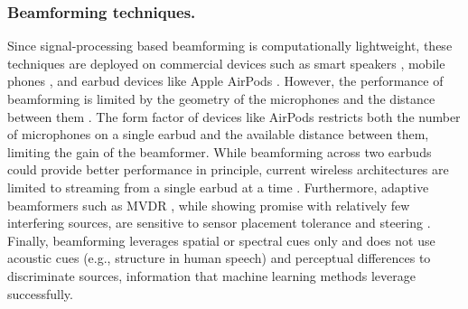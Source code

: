 \documentclass [11pt, proquest] {uwthesis}[2020/02/24]
\begin{document}
\subsubsection{Beamforming techniques.}  Since signal-processing based beamforming is computationally lightweight, these techniques are deployed on  commercial devices such as smart speakers \cite{amazon}, mobile phones \cite{samsungglobalnewsroom_2014}, and earbud devices like Apple AirPods \cite{airpods}. However, the performance of beamforming is limited by the geometry of the microphones and the distance between them \cite{van1988beamforming, InvenSense}. The form factor of devices like AirPods restricts both the number of microphones on a single earbud and the available distance between them, limiting the gain of the beamformer. While beamforming  across two earbuds could provide better performance in principle, current wireless architectures are limited to streaming from a single earbud at a time \cite{bluetooth}. Furthermore, adaptive beamformers such as MVDR \cite{frost1972MVDR}, while showing promise with relatively few interfering sources,  are sensitive to sensor placement tolerance and steering \cite{zhang2017deep, brandstein2001microphone}. Finally, beamforming leverages spatial or spectral cues only and does not use acoustic cues (e.g., structure in human speech) and perceptual differences to discriminate sources, information that machine learning methods leverage successfully.






\end{document}
